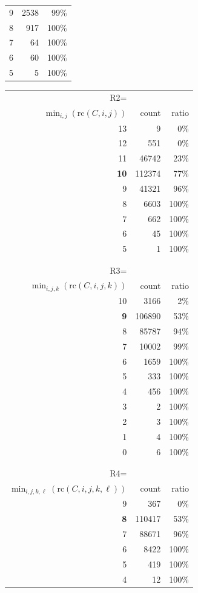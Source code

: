 \documentclass[11pt,twoside]{article}
\begin{document}
\begin{table}[htbp]
\begin{tabular}{rrr}
  9 &   2538 & 99\% \\
  8 &    917 &100\% \\
  7 &     64 &100\% \\
  6 &     60 &100\% \\
  5 &      5 &100\% \\
  \end{tabular}
\quad
  \begin{tabular}{rrr}
\hline
R2=\\
$\min_{i,j}(\mbox{rc}(C,i,j))$ & count & ratio\\
\hline
 13 &      9 &  0\% \\
 12 &    551 &  0\% \\
 11 &  46742 & 23\% \\
 \textbf{10} & 112374 & 77\% \\
  9 &  41321 &96\% \\
  8 &   6603 &100\% \\
  7 &    662 &100\% \\
  6 &     45 &100\% \\
  5 &     1 & 100\% \\
\\ \\
\hline
R3=\\
$\min_{i,j,k}(\mbox{rc}(C,i,j,k))$ & count & ratio\\
\hline
 10 &   3166 &  2\% \\
  \textbf{9} & 106890 & 53\% \\
  8 &  85787 & 94\% \\
  7 &  10002 & 99\% \\
  6 &   1659 &100\% \\
  5 &    333 &100\% \\
  4 &    456 &100\% \\
  3 &      2 &100\% \\
  2 &      3 &100\% \\
  1 &      4 &100\% \\
  0 &      6 &100\% \\
\\ \\
\hline
R4=\\
$\min_{i,j,k,\ell}(\mbox{rc}(C,i,j,k,\ell))$ & count & ratio\\
\hline
  9 &    367 &  0\% \\
  \textbf{8} & 110417 & 53\% \\
  7 &  88671 & 96\% \\
  6 &   8422 &100\% \\
  5 &    419 &100\% \\
  4 &     12 &100\% \\


\end{tabular}
\end{table}
\end{document}
